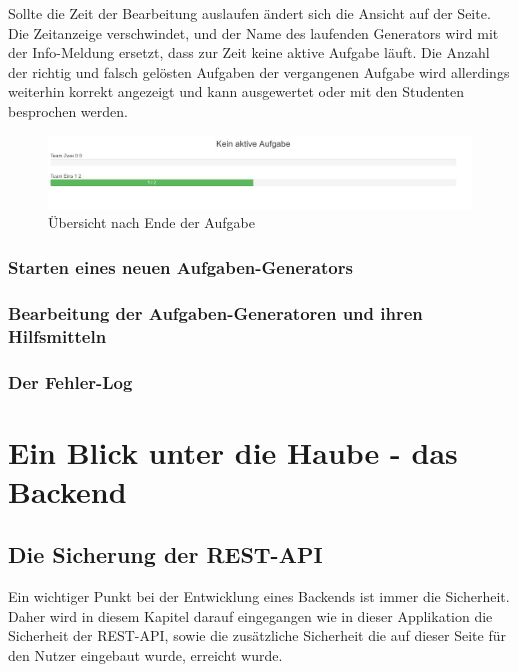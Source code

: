Sollte die Zeit der Bearbeitung auslaufen ändert sich die Ansicht auf der Seite. Die Zeitanzeige verschwindet, und der Name des laufenden Generators wird mit der Info-Meldung ersetzt, dass zur Zeit keine aktive Aufgabe läuft. Die Anzahl der richtig und falsch gelösten Aufgaben der vergangenen Aufgabe wird allerdings weiterhin korrekt angezeigt und kann ausgewertet oder mit den Studenten besprochen werden.

\begin{figure}[htp]     %
\centering
\includegraphics[width=1\textwidth]{bilder/TaskOver} 
\caption[Übersicht nach Ende der Aufgabe]{Übersicht nach Ende der Aufgabe}
\end{figure} 



\subsection{Starten eines neuen Aufgaben-Generators}
\subsection{Bearbeitung der Aufgaben-Generatoren und ihren Hilfsmitteln}
\subsection{Der Fehler-Log}




\chapter{Ein Blick unter die Haube - das Backend}

\section{Die Sicherung der REST-API}

Ein wichtiger Punkt bei der Entwicklung eines Backends ist immer die Sicherheit. Daher wird in diesem Kapitel darauf eingegangen wie in dieser Applikation die Sicherheit der REST-API, sowie die zusätzliche Sicherheit die auf dieser Seite für den Nutzer eingebaut wurde, erreicht wurde. \\

